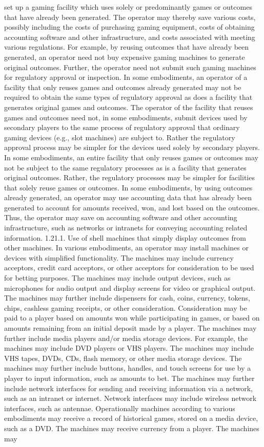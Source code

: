 \documentclass[11pt,a4paper]{article}
\begin{document}
set up a gaming facility which uses solely or predominantly games or outcomes that have already been generated. The operator may thereby save various costs, possibly including the costs of purchasing gaming equipment, costs of obtaining accounting software and other infrastructure, and costs associated with meeting various regulations. For example, by reusing outcomes that have already been generated, an operator need not buy expensive gaming machines to generate original outcomes. Further, the operator need not submit such gaming machines for regulatory approval or inspection. In some embodiments, an operator of a facility that only reuses games and outcomes already generated may not be required to obtain the same types of regulatory approval as does a facility that generates original games and outcomes. The operator of the facility that reuses games and outcomes need not, in some embodiments, submit devices used by secondary players to the same process of regulatory approval that ordinary gaming devices (e.g., slot machines) are subject to. Rather the regulatory approval process may be simpler for the devices used solely by secondary players. In some embodiments, an entire facility that only reuses games or outcomes may not be subject to the same regulatory processes as is a facility that generates original outcomes. Rather, the regulatory processes may be simpler for facilities that solely reuse games or outcomes. In some embodiments, by using outcomes already generated, an operator may use accounting data that has already been generated to account for amounts received, won, and lost based on the outcomes. Thus, the operator may save on accounting software and other accounting infrastructure, such as networks or intranets for conveying accounting related information. 1.21.1. Use of shell machines that simply display outcomes from other machines. In various embodiments, an operator may install machines or devices with simplified functionality. The machines may include currency acceptors, credit card acceptors, or other acceptors for consideration to be used for betting purposes. The machines may include output devices, such as microphones for audio output and display screens for video or graphical output. The machines may further include dispensers for cash, coins, currency, tokens, chips, cashless gaming receipts, or other consideration. Consideration may be paid to a player based on amounts won while participating in games, or based on amounts remaining from an initial deposit made by a player. The machines may further include media players and/or media storage devices. For example, the machines may include DVD players or VHS players. The machines may include VHS tapes, DVDs, CDs, flash memory, or other media storage devices. The machines may further include buttons, handles, and touch screens for use by a player to input information, such as amounts to bet. The machines may further include network interfaces for sending and receiving information via a network, such as an intranet or internet. Network interfaces may include wireless network interfaces, such as antennae. Operationally machines according to various embodiments may receive a record of historical games, stored on a media device, such as a DVD. The machines may receive currency from a player. The machines may 
\end{document}
